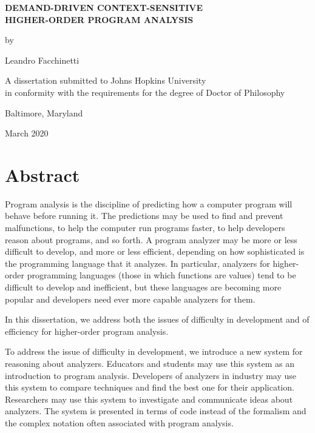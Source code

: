 \documentclass[12pt, oneside]{book}
\begin{document}
\frontmatter

\begin{center}
  \begin{singlespace}
    \vspace*{0.5in}

    \textbf{\uppercase{Demand-Driven Context-Sensitive\\Higher-Order Program Analysis}}

    \vspace*{1in}

    by
    
    Leandro Facchinetti

    \vspace*{1.5in}

    A dissertation submitted to Johns Hopkins University\\in conformity with the requirements for the degree of Doctor of Philosophy

    \vspace*{0.5in}

    Baltimore, Maryland
    
    March 2020
  \end{singlespace}
\end{center}

\thispagestyle{empty}
\clearpage

\chapter{Abstract}

Program analysis is the discipline of predicting how a computer program will behave before running it. The predictions may be used to find and prevent malfunctions, to help the computer run programs faster, to help developers reason about programs, and so forth. A program analyzer may be more or less difficult to develop, and more or less efficient, depending on how sophisticated is the programming language that it analyzes. In particular, analyzers for higher-order programming languages (those in which functions are values) tend to be difficult to develop and inefficient, but these languages are becoming more popular and developers need ever more capable analyzers for them.

In this dissertation, we address both the issues of difficulty in development and of efficiency for higher-order program analysis.

To address the issue of difficulty in development, we introduce a new system for reasoning about analyzers. Educators and students may use this system as an introduction to program analysis. Developers of analyzers in industry may use this system to compare techniques and find the best one for their application. Researchers may use this system to investigate and communicate ideas about analyzers. The system is presented in terms of code instead of the formalism and the complex notation often associated with program analysis.
\end{document}

